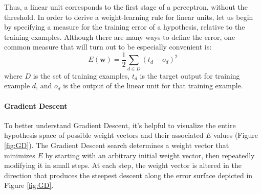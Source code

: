 \documentclass{tufte-handout}
\begin{document}
Thus, a linear unit corresponds to the first stage of a perceptron, without the threshold.
In order to derive a weight-learning rule for linear units, let us begin by specifying a measure for the training error of a hypothesis, relative to the training examples. Although there are many ways to define the error, one common measure that will turn out to be especially convenient is:
\begin{equation} \label{eq:7}
    E(\mathbf{w}) = \frac{1}{2}\sum_{d\in D} (t_d - o_d)^2
\end{equation}
where $D$ is the set of training examples, $t_d$ is the target output for training example $d$, and $o_d$ is the output of the linear unit for that training example.

\paragraph{Gradient Descent}

To better understand Gradient Descent, it's helpful to visualize the entire hypothesis space of possible weight vectors and their associated $E$ values (Figure \ref{fig:GD}). The Gradient Descent search determines a weight vector that minimizes $E$ by starting with an arbitrary initial weight vector, then repeatedly modifying it in small steps. At each step, the weight vector is altered in the direction that produces the steepest descent along the error surface depicted in Figure \ref{fig:GD}.

\begin{marginfigure}
\centering
{}
\caption{Generic representation of a hypothesis space}
\label{fig:GD}
\end{marginfigure}
\end{document}
